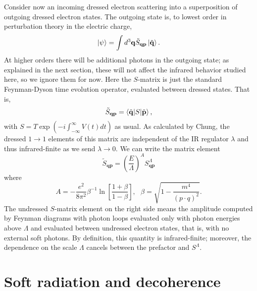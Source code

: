 \documentclass[twocolumn,prd]{revtex4}
\newcommand{\be}{\begin{equation}}
\newcommand{\ee}{\end{equation}}
\newcommand{\mb}{\mathbf}
\begin{document}
Consider now an incoming dressed electron scattering into a superposition of outgoing dressed electron states. The outgoing state is, to lowest order in perturbation theory in the electric charge,
\begin{align}
\begin{split}
\label{outstate}
\ket{\psi} = \int d^3\mb{q} \tilde{S}_{\mb{q} \mb{p}} \ket{\tilde{\mb{q}}}.
\end{split}
\end{align}
At higher orders there will be additional photons in the outgoing state; as explained in the next section, these will not affect the infrared behavior studied here, so we ignore them for now. Here the $S$-matrix is just the standard Feynman-Dyson time evolution operator, evaluated between dressed states. That is,
\be
\tilde{S}_{\mb{q} \mb{p}} = \braket{ \tilde{\mb{q}} | S | \tilde{\mb{p}}},
\ee
with $S = T \exp \left( -i \int_{-\infty}^{\infty} V(t) dt \right)$ as usual.\cite{Weinberg:1995mt} As calculated by Chung, the dressed $1 \to 1$ elements of this matrix are independent of the IR regulator $\lambda$ and thus infrared-finite as we send $\lambda \to 0$. We can write the matrix element
\be
\tilde{S}_{\mb{q} \mb{p}} = \left( \frac{E}{\Lambda} \right)^{A} S_{\mb{q} \mb{p}}^{\Lambda}
\ee
where
\be
A = - \frac{e^2}{8\pi^2} \beta^{-1} \ln \left[ \frac{1+\beta}{1-\beta} \right], \ \ \ \beta = \sqrt{1 - \frac{m^4}{(p \cdot q)^2}}.
\ee
The undressed $S$-matrix element on the right side means the amplitude computed by Feynman diagrams with photon loops evaluated only with photon energies above $\Lambda$ and evaluated between undressed electron states, that is, with no external soft photons. By definition, this quantity is infrared-finite; moreover, the dependence on the scale $\Lambda$ cancels between the prefactor and $S^{\Lambda}$.








\section{Soft radiation and decoherence}
\end{document}

